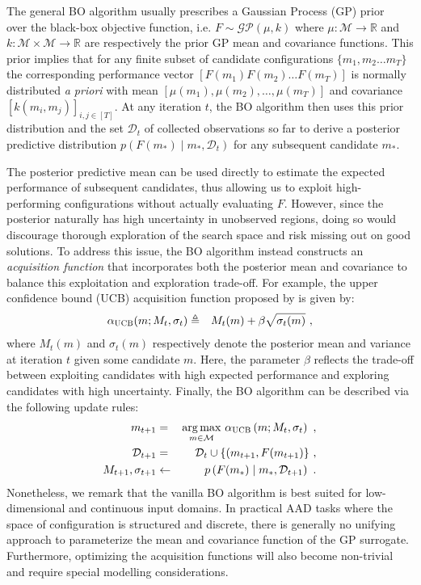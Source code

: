 The general BO algorithm usually prescribes a Gaussian Process (GP) prior~\cite{Rasmussen06} over the black-box objective function, i.e. $F \sim \mathcal{GP}(\mu, k)$ where $\mu: \mathcal{M} \rightarrow \mathbb{R}$ and $k: \mathcal{M}\times\mathcal{M} \rightarrow \mathbb{R}$ are respectively the prior GP mean and covariance functions. This prior implies that for any finite subset of candidate configurations $\{m_1, m_2 \dots m_T\}$ the corresponding performance vector $\left[F(m_1) F(m_2) \dots F(m_T)\right]$ is normally distributed \emph{a priori} with mean $\left[\mu(m_1), \mu(m_2), \dots ,\mu(m_T)\right]$ and covariance $\left[k(m_i, m_j)\right]_{i,j\in[T]}$. At any iteration $t$, the BO algorithm then uses this prior distribution and the set $\mathcal{D}_t$ of collected observations so far to derive a posterior predictive distribution $p(F(m_\ast) \mid m_\ast, \mathcal{D}_{t})$ for any subsequent candidate $m_\ast$. 

The posterior predictive mean can be used directly to estimate the expected performance of subsequent candidates, thus allowing us to exploit high-performing configurations without actually evaluating $F$. However, since the posterior naturally has high uncertainty in unobserved regions, doing so would discourage thorough exploration of the search space and risk missing out on good solutions. To address this issue, the BO algorithm instead constructs an \emph{acquisition function} that incorporates both the posterior mean and covariance to balance this exploitation and exploration trade-off. For example, the upper confidence bound (UCB) acquisition function proposed by \citet{Srinivas10} is given by:
\begin{eqnarray}
\alpha_{\textsc{UCB}}(m; M_t, \sigma_t) &\triangleq& M_t(m) + \beta \sqrt{\sigma_t(m)} \ ,
\end{eqnarray}
where $M_t(m)$ and $\sigma_t(m)$ respectively denote the posterior mean and variance at iteration $t$ given some candidate $m$. Here, the parameter $\beta$ reflects the trade-off between exploiting candidates with high expected performance and exploring candidates with high uncertainty. Finally, the BO algorithm can be described via the following update rules:
\begin{eqnarray}
m_{t+1} &=& \underset{m \in \mathcal{M}}{\argmax} \ \alpha_{\textsc{UCB}}\left(m; M_t, \sigma_t\right) \ , \nonumber \\
\mathcal{D}_{t+1} &=& \mathcal{D}_{t} \cup \{(m_{t+1}, F(m_{t+1})\} \ , \nonumber \\
M_{t+1}, \sigma_{t+1} &\leftarrow& p\left(F(m_\ast) \mid m_\ast, \mathcal{D}_{t+1}\right) \ .
\end{eqnarray}
Nonetheless, we remark that the vanilla BO algorithm is best suited for low-dimensional and continuous input domains. In practical AAD tasks where the space of configuration is structured and discrete, there is generally no unifying approach to parameterize the mean and covariance function of the GP surrogate. Furthermore, optimizing the acquisition functions will also become non-trivial and require special modelling considerations. 

